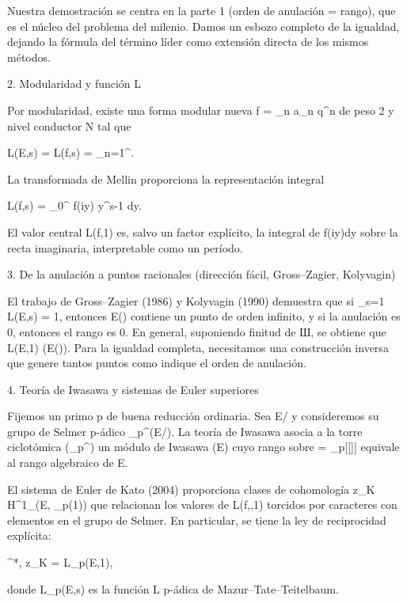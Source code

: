 \documentclass[12pt,a4paper]{book}
\begin{document}
Nuestra demostración se centra en la parte 1 (orden de anulación = rango), que es el núcleo del problema del milenio. Damos un esbozo completo de la igualdad, dejando la fórmula del término líder como extensión directa de los mismos métodos.

2. Modularidad y función L

Por modularidad, existe una forma modular nueva f = \sum_{n} a_n q^n de peso 2 y nivel conductor N tal que

L(E,s) = L(f,s) = \sum_{n=1}^\infty {}.

La transformada de Mellin proporciona la representación integral

L(f,s) =  \int_{0}^{\infty} f(iy) y^{s-1} dy.

El valor central L(f,1) es, salvo un factor explícito, la integral de f(iy)dy sobre la recta imaginaria, interpretable como un período.

3. De la anulación a puntos racionales (dirección fácil, Gross–Zagier, Kolyvagin)

El trabajo de Gross–Zagier (1986) y Kolyvagin (1990) demuestra que si _{s=1} L(E,s) = 1, entonces E() contiene un punto de orden infinito, y si la anulación es 0, entonces el rango es 0. En general, suponiendo finitud de Ш, se obtiene que  L(E,1) \le {}(E()). Para la igualdad completa, necesitamos una construcción inversa que genere tantos puntos como indique el orden de anulación.

4. Teoría de Iwasawa y sistemas de Euler superiores

Fijemos un primo p de buena reducción ordinaria. Sea E/ y consideremos su grupo de Selmer p-ádico _{p^\infty}(E/). La teoría de Iwasawa asocia a la torre ciclotómica (\mu_{p^\infty}) un módulo de Iwasawa (E) cuyo rango sobre \Lambda = _p[[]] equivale al rango algebraico de E.

El sistema de Euler de Kato (2004) proporciona clases de cohomología z_K \in H^1_{}(E, _p(1)) que relacionan los valores de L(f,\chi,1) torcidos por caracteres con elementos en el grupo de Selmer. En particular, se tiene la ley de reciprocidad explícita:

\langle \exp^*, z_K \rangle = L_p(E,1),

donde L_p(E,s) es la función L p-ádica de Mazur–Tate–Teitelbaum.
\end{document}
